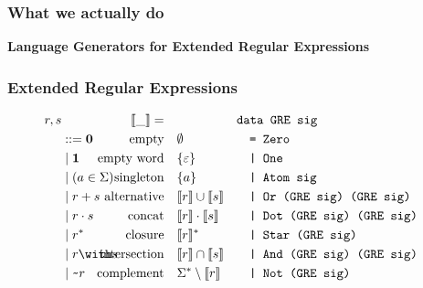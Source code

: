\documentclass[pdftex,aspectratio=169]{beamer}
\begin{document}
\begin{frame}
  \frametitle{What we actually do}
  \begin{Huge}
    \begin{center}
      \bf
      Language Generators for Extended Regular Expressions
    \end{center}
  \end{Huge}
\end{frame}
\begin{frame}
  \frametitle{Extended Regular Expressions}
  \vspace{-\baselineskip}
  \footnotesize
  \begin{align*}
    r, s & &\Lang{\_}=\quad &  &
                             \makebox[1em][l]{\code{data GRE sig}}\\
         & ::= \Rnull & \ltext{empty}
                        & \emptyset
                           &&\code{= Zero}\\
         & \mid \Rempty & \ltext{empty word}
                        & \{ \varepsilon \}
                           && \code{| One}\\
         & \mid (a \in \Sigma) & \ltext{singleton}
                        &  \{ a \}
                           && \code{| Atom sig} \\
         & \mid \Runion rs & \ltext{alternative}
                        &  \Lang{r} \cup \Lang{s}
                           && \code{| Or (GRE sig) (GRE sig)}\\
         & \mid \Rconcat rs & \ltext{concat}
                        &  \Lang r \cdot \Lang s
                           && \code{| Dot (GRE sig) (GRE sig)}\\
         & \mid \Rstar r & \ltext{closure}
                        & \Lang r^* 
                           && \code{| Star (GRE sig)}\\
         & \mid \Rintersect rs & \ltext{intersection}
                        & \Lang r \cap \Lang s
                           && \code{| And (GRE sig) (GRE sig)}\\
         & \mid \Rcomplement r & \ltext{complement}
                        & \Sigma^* \setminus \Lang r
                           && \code{| Not (GRE sig)}
  \end{align*}
\end{frame} 
\end{document}
